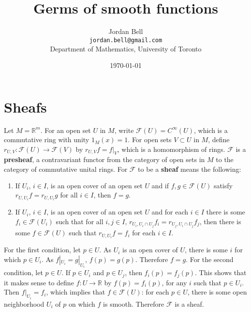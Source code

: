 \documentclass{article}
\theoremstyle{definition}
\begin{document}
\title{Germs of smooth functions}
\author{Jordan Bell\\ \texttt{jordan.bell@gmail.com}\\Department of Mathematics, University of Toronto}
\date{\today}

\maketitle

\section{Sheafs}
Let $M=\mathbb{R}^m$. 
For an open set $U$ in $M$, write $\mathcal{F}(U) = C^\infty(U)$, which is a commutative ring with unity $1_M(x)=1$. 
For open sets $V \subset U$ in $M$, define $r_{U,V}:\mathcal{F}(U) \to \mathcal{F}(V)$ by
$r_{U,V} f = f|_V$, which is a homomorphism of rings. 
$\mathcal{F}$ is a \textbf{presheaf}, a contravariant functor from the category of
open  sets in $M$ to the category of commutative unital rings. For $\mathcal{F}$ to be a \textbf{sheaf} means
the following:
\begin{enumerate}
\item If $U_i$, $i \in I$, is an open cover of an open set $U$ and if $f,g \in \mathcal{F}(U)$ satisfy
$r_{U,U_i} f = r_{U,U_i} g$ for all $i \in I$, then $f=g$.
\item If $U_i$, $i \in I$, is an open cover of an open set $U$ and for each $i \in I$ there is some $f_i \in \mathcal{F}(U_i)$ such that
for all $i,j \in I$, $r_{U_i, U_i \cap U_j} f_i = r_{U_j, U_i \cap U_j} f_j$, then there is some $f \in \mathcal{F}(U)$ such that 
$r_{U,U_i} f = f_i$ for each $i \in I$.
\end{enumerate}
For the first condition, let $p \in U$. As $U_i$ is an open cover of $U$, there is some $i$ for which $p \in U_i$. 
As $f|_{U_i} = g|_{U_i}$, $f(p)=g(p)$. Therefore $f=g$. For the second condition, 
let $p \in U$. If $p \in U_i$ and $p \in U_j$, then $f_i(p) = f_j(p)$. This shows that it makes
sense to define $f:U \to \mathbb{R}$ by $f(p)=f_i(p)$, for any $i$ such that $p \in U_i$. 
Then $f|_{U_i} = f_i$, which implies that $f \in \mathcal{F}(U)$: for each $p \in U$, there is some
open neighborhood $U_i$ of $p$ on which $f$ is smooth. Therefore
$\mathcal{F}$ is a sheaf.
\end{document}
